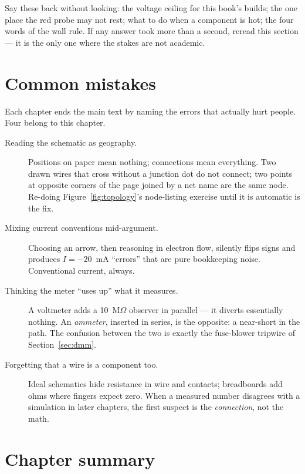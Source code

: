 \begin{checkpoint}
Say these back without looking: the voltage ceiling for this book's builds;
the one place the red probe may not rest; what to do when a component is hot;
the four words of the wall rule. If any answer took more than a second, reread
this section — it is the only one where the stakes are not academic.
\end{checkpoint}

\section{Common mistakes}
\label{sec:mistakes01}

Each chapter ends the main text by naming the errors that actually hurt people.
Four belong to this chapter.

\begin{description}
\item[Reading the schematic as geography.] Positions on paper mean nothing;
connections mean everything. Two drawn wires that cross without a junction dot
do not connect; two points at opposite corners of the page joined by a net name
are the same node. Re-doing Figure~\ref{fig:topology}'s node-listing exercise
until it is automatic is the fix. 
\item[Mixing current conventions mid-argument.] Choosing an arrow, then
reasoning in electron flow, silently flips signs and produces $I = -20$~mA
``errors'' that are pure bookkeeping noise. Conventional current, always.
\item[Thinking the meter ``uses up'' what it measures.] A voltmeter adds a
10~M$\Omega$ observer in parallel — it diverts essentially nothing. An
\emph{ammeter}, inserted in series, is the opposite: a near-short in the path.
The confusion between the two is exactly the fuse-blower tripwire of
Section~\ref{sec:dmm}. 
\item[Forgetting that a wire is a component too.] Ideal schematics hide
resistance in wire and contacts; breadboards add ohms where fingers expect
zero. When a measured number disagrees with a simulation in later chapters,
the first suspect is the \emph{connection}, not the math.
\end{description}

\section{Chapter summary}
\label{sec:ch1summary}


